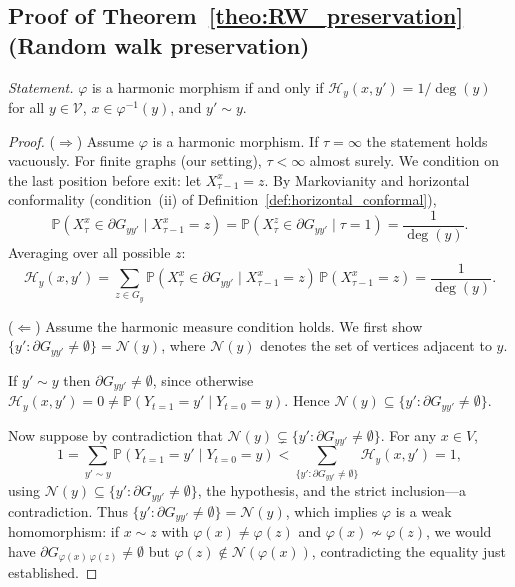 \documentclass[twocolumn,superscriptaddress,tightenlines,aps,prx,floatfix]{revtex4-2}
\begin{document}
\begin{bibunit}
\subsection{Proof of Theorem~\ref*{theo:RW_preservation} (Random walk preservation)}

\textit{Statement.} $\varphi$ is a harmonic morphism if and only if $\mathcal{H}_y(x, y') = 1/\deg(y)$ for all $y \in \mathcal{V}$, $x \in \varphi^{-1}(y)$, and $y' \sim y$.

\begin{proof}

\noindent ($\Rightarrow$) Assume $\varphi$ is a harmonic morphism. If $\tau = \infty$ the statement holds vacuously. For finite graphs (our setting), $\tau < \infty$ almost surely. We condition on the last position before exit: let $X^x_{\tau-1} = z$. By Markovianity and horizontal conformality (condition~(ii) of Definition~\ref{def:horizontal_conformal}),
\[
\mathbb{P}(X^x_\tau \in \partial G_{yy'} \mid X^x_{\tau-1} = z) = \mathbb{P}(X^z_\tau \in \partial G_{yy'} \mid \tau = 1) = \frac{1}{\deg(y)}.
\]
Averaging over all possible $z$:
\[
\mathcal{H}_y(x, y') = \sum_{z \in G_y} \mathbb{P}(X^x_\tau \in \partial G_{yy'} \mid X^x_{\tau-1} = z)\, \mathbb{P}(X^x_{\tau-1} = z) = \frac{1}{\deg(y)}.
\]

\noindent ($\Leftarrow$) Assume the harmonic measure condition holds. We first show $\{y' : \partial G_{yy'} \neq \emptyset\} = \mathcal{N}(y)$, where $\mathcal{N}(y)$ denotes the set of vertices adjacent to $y$.

If $y' \sim y$ then $\partial G_{yy'} \neq \emptyset$, since otherwise $\mathcal{H}_y(x, y') = 0 \neq \mathbb{P}(Y_{t=1} = y' \mid Y_{t=0} = y)$. Hence $\mathcal{N}(y) \subseteq \{y' : \partial G_{yy'} \neq \emptyset\}$.

Now suppose by contradiction that $\mathcal{N}(y) \subsetneq \{y' : \partial G_{yy'} \neq \emptyset\}$. For any $x \in V$,
\[
1 = \sum_{y' \sim y} \mathbb{P}(Y_{t=1} = y' \mid Y_{t=0} = y) < \sum_{\{y' : \partial G_{yy'} \neq \emptyset\}} \mathcal{H}_y(x, y') = 1,
\]
using $\mathcal{N}(y) \subseteq \{y' : \partial G_{yy'} \neq \emptyset\}$, the hypothesis, and the strict inclusion---a contradiction. Thus $\{y' : \partial G_{yy'} \neq \emptyset\} = \mathcal{N}(y)$, which implies $\varphi$ is a weak homomorphism: if $x \sim z$ with $\varphi(x) \neq \varphi(z)$ and $\varphi(x) \not\sim \varphi(z)$, we would have $\partial G_{\varphi(x)\,\varphi(z)} \neq \emptyset$ but $\varphi(z) \notin \mathcal{N}(\varphi(x))$, contradicting the equality just established.


\end{proof}
\end{bibunit}
\end{document}
